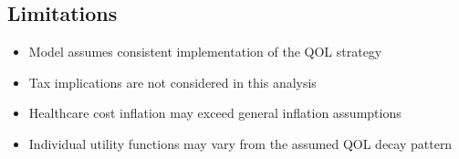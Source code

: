 \documentclass[11pt,a4paper]{article}
\begin{document}
\subsection{Limitations}

\begin{itemize}
\item Model assumes consistent implementation of the QOL strategy
\item Tax implications are not considered in this analysis
\item Healthcare cost inflation may exceed general inflation assumptions
\item Individual utility functions may vary from the assumed QOL decay pattern
\end{itemize}
\end{document}
